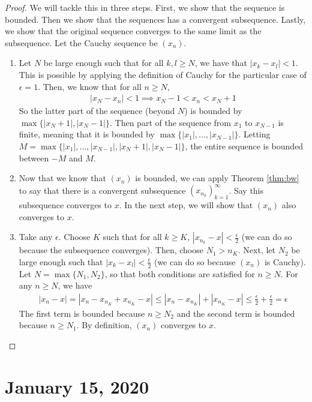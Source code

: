 \documentclass[11pt]{article}
\newcommand{\e}{\epsilon}
\theoremstyle{plain}
\theoremstyle{definition}
\theoremstyle{remark}
\begin{document}
\begin{proof}
    We will tackle this in three steps. First, we show that the sequence is bounded. Then we show that the sequences has a convergent subsequence. Lastly, we show that the original sequence converges to the same limit as the subsequence. Let the Cauchy sequence be $(x_n)$.
    \begin{enumerate}
        \item Let $N$ be large enough such that for all $k, l \geq N$, we have that $|x_k - x_l| < 1$. This is possible by applying the definition of Cauchy for the particular case of $\e = 1$. Then, we know that for all $n \geq N$,
        \begin{align*}
            |x_N - x_n| < 1 \implies x_N - 1 < x_n < x_N + 1
        \end{align*}
        So the latter part of the sequence (beyond $N$) is bounded by $\max\{|x_N + 1|, |x_N - 1|\}$. Then part of the sequence from $x_1$ to $x_{N-1}$ is finite, meaning that it is bounded by $\max\{|x_1|, ..., |x_{N-1}|\}$. Letting $M = \max\{|x_1|, ..., |x_{N-1}|, |x_N + 1|, |x_N - 1|\}$, the entire sequence is bounded between $-M$ and $M$.
        \item Now that we know that $(x_n)$ is bounded, we can apply Theorem \ref{thm:bw} to say that there is a convergent subsequence $(x_{n_k})_{k=1}^\infty$. Say this subsequence converges to $x$. In the next step, we will show that $(x_n)$ also converges to $x$.
        \item Take any $\epsilon$. Choose $K$ such that for all $k \geq K$, 
        $|x_{n_k} - x| < \frac{\e}{2}$ (we can do so because the subsequence converges). Then, choose $N_1 > n_K$. Next, let $N_2$ be large enough such that $|x_k - x_l| < \frac{\e}{2}$ (we can do so because $(x_n)$ is Cauchy). Let $N = \max\{N_1, N_2\}$, so that both conditions are satisfied for $n \geq N$. For any $n \geq N$, we have
        \begin{align*}
            |x_n - x| = |x_n - x_{n_K} + x_{n_K} - x| \leq |x_n - x_{n_K}| + |x_{n_K} - x| \leq \frac{\e}{2} + \frac{\e}{2} = \e
        \end{align*}
        The first term is bounded because $n \geq N_2$ and the second term is bounded because $n \geq N_1$. By definition, $(x_n)$ converges to $x$.
    \end{enumerate}
\end{proof}

\section{January 15, 2020}
\end{document}
